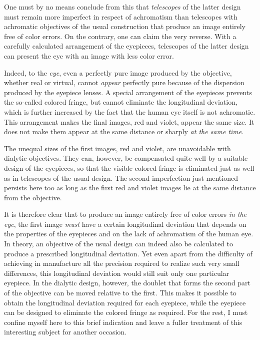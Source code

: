 One must by no means conclude from this that \textit{telescopes} of the latter design must remain more imperfect in respect of achromatism than telescopes with achromatic objectives of the usual construction that produce an image entirely free of color errors. On the contrary, one can claim the very reverse. With a carefully calculated arrangement of the eyepieces, telescopes of the latter design can present the eye with an image with less color error.

Indeed, to the \textit{eye}, even a perfectly pure image produced by the objective, whether real or virtual, cannot \textit{appear} perfectly pure because of the dispersion produced by the eyepiece lenses. A special arrangement of the eyepieces prevents the so-called colored fringe, but cannot eliminate the longitudinal deviation, which is further increased by the fact that the human eye itself is not achromatic. This arrangement makes the final images, red and violet, appear the same size. It does not make them appear at the same distance or sharply \textit{at the same time}.

The unequal sizes of the first images, red and violet, are unavoidable with dialytic objectives. They can, however, be compensated quite well by a suitable design of the eyepieces, so that the visible colored fringe is eliminated just as well as in telescopes of the usual design. The second imperfection just mentioned persists here too as long as the first red and violet images lie at the same distance from the objective.

It is therefore clear that to produce an image entirely free of color errors \textit{in the eye}, the first image \textit{must} have a certain longitudinal deviation that depends on the properties of the eyepieces and on the lack of achromatism of the human eye. In theory, an objective of the usual design can indeed also be calculated to produce a prescribed longitudinal deviation. Yet even apart from the difficulty of achieving in manufacture all the
precision required to realize such very small differences, this longitudinal deviation would still suit only one particular eyepiece. In the dialytic design, however, the doublet that forms the second part of the objective can be moved relative to the first. This makes it possible to obtain the longitudinal deviation required for each eyepiece, while the eyepiece can be designed to eliminate the colored fringe as required. For the rest, I must confine myself here to this brief indication and leave a fuller treatment of this interesting subject for another occasion.

